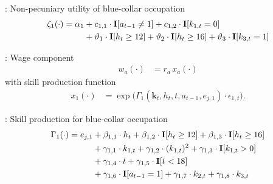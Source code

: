 \begin{frame}{\insertsection: Non-pecuniary utility of blue-collar occupation}
%
  \begin{align*}
  \zeta_{1}(\cdot)  = \alpha_1 & + c_{1,1} \cdot {\textbf{I}}[a_{t-1} \neq 1] + c_{1,2} \cdot {\textbf{I}}[k_{1,t} = 0] \\
                              & + \vartheta_1 \cdot {\textbf{I}}[h_t \geq 12] + \vartheta_2 \cdot {\textbf{I}}[h_t \geq 16] + \vartheta_3 \cdot {\textbf{I}}[k_{3,t} = 1]
  \end{align*}
\end{frame}
\begin{frame}{\insertsection: Wage component}
%
\begin{align*}
w_{a}(\cdot) & = r_{a} \, x_{a}(\cdot)
\end{align*}
with skill production function
\begin{align*}
x_{1}(\cdot) & = \exp \big( \Gamma_{1}(\bm{k}_t,  h_t, t, a_{t-1}, e_{j,1}) \cdot \epsilon_{1,t} \big).
\end{align*}
\end{frame}
\begin{frame}{\insertsection: Skill production for blue-collar occupation}
%
\begin{align*}
     \Gamma_1(\cdot) = e_{j,1} & + \beta_{1,1} \cdot h_t + \beta_{1, 2} \cdot {\textbf{I}}[h_t \geq 12] + \beta_{1,3} \cdot {\textbf{I}}[h_t\geq 16]\\
                                   & + \gamma_{1, 1} \cdot  k_{1,t} + \gamma_{1,2} \cdot  (k_{1,t})^2 + \gamma_{1,3} \cdot  {\textbf{I}}[k_{1,t} > 0] \\
                                 & + \gamma_{1,4} \cdot  t + \gamma_{1,5} \cdot {\textbf{I}}[t < 18]\\
                                   & + \gamma_{1,6} \cdot {\textbf{I}}[a_{t-1} = 1] + \gamma_{1,7} \cdot  k_{2,t} + \gamma_{1,8} \cdot  k_{3,t}
\end{align*}
\end{frame}
